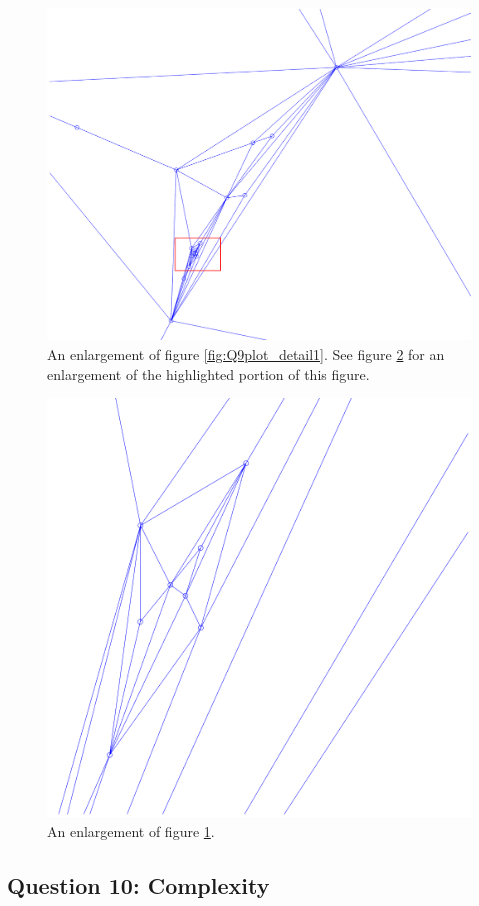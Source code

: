 \documentclass[a4paper]{article}
\begin{document}
\begin{figure}[H]
    \centering
    \includegraphics[width=0.95\columnwidth]{Q9zoom_in2_crop.png}
    \caption{An enlargement of figure \ref{fig:Q9plot_detail1}. See figure \ref{fig:Q9plot_detail3} for an enlargement of the highlighted portion of this figure.}
    \label{fig:Q9plot_detail2}
\end{figure}
\begin{figure}[H]
    \centering
    \includegraphics[width=0.7\columnwidth]{Q9zoom_in3_crop.png}
    \caption{An enlargement of figure \ref{fig:Q9plot_detail2}.}
    \label{fig:Q9plot_detail3}
\end{figure}

\newpage
\subsection*{Question 10: Complexity}
\end{document}
